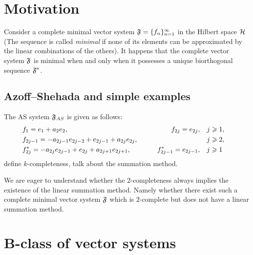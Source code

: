 \documentclass[12pt]{article}
\begin{document}


\section{Motivation}
  Consider a complete minimal vector system $\fsys = \seq{f}$ in the Hilbert space $\cal{H}$
  (The sequence is called \emph{minimal} if none of its elements can be approximated by the linear
    combinations of the others).
  It happens that the complete vector system $\fsys$ is minimal when and only when it possesses a unique
    biorthogonal sequence $\fstarsys$.
  
  \subsection{Azoff--Shehada and simple examples}
    The AS system $\fsys_{AS}$ is given as follows:
    \begin{equation}
      \label{as-sys}
      \begin{aligned}
        &f_1 = e_1 + a_2 e_2, \qquad &f_{2j}=e_{2j}, \quad&j \geq 1,&\\
        &f_{2j-1}=-a_{2j-1}e_{2j-2} + e_{2j-1} + a_{2j}e_{2j}, \qquad &\makebox[5em]{} \quad&j \geq 2,&\\
        &f^*_{2j}=-a_{2j}e_{2j-1}+e_{2j}+a_{2j+1}e_{2j+1}, \qquad &f^*_{2j-1}=e_{2j-1}, \quad&j \geq 1&
      \end{aligned}
    \end{equation}
    define $k$-completeness, talk about the summation method.

    We are eager to understand whether the $2$-completeness always implies the existence of the linear summation method.
    Namely whether there exist such a complete minimal vector system $\fsys$ which is $2$-complete but does not have a
      linear summation method.

\section{B-class of vector systems}
\end{document}
